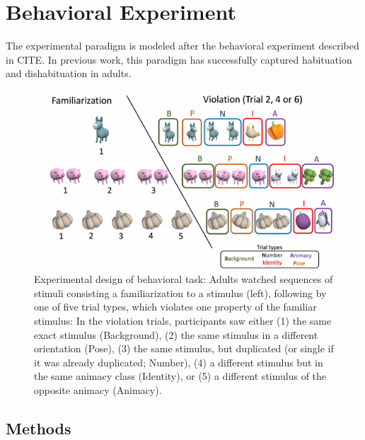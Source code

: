 \documentclass[10pt, letterpaper]{article}
\newenvironment{CodeChunk}{}{}
\begin{document}
\hypertarget{behavioral-experiment}{%
\section{Behavioral Experiment}\label{behavioral-experiment}}

The experimental paradigm is modeled after the behavioral experiment
described in CITE. In previous work, this paradigm has successfully
captured habituation and dishabituation in adults.

\begin{CodeChunk}
\begin{figure}[H]

{\centering \includegraphics{figs/design_fig-1} 

}

\caption[Experimental design of behavioral task]{Experimental design of behavioral task: Adults watched sequences of stimuli consisting a familiarization to a stimulus (left), following by one of five trial types, which violates one property of the familiar stimulus: In the violation trials, participants saw either (1) the same exact stimulus (Background), (2) the same stimulus in a different orientation (Pose), (3) the same stimulus, but duplicated (or single if it was already duplicated; Number), (4) a different stimulus but in the same animacy class (Identity), or (5) a different stimulus of the opposite animacy (Animacy).}\label{fig:design_fig}
\end{figure}
\end{CodeChunk}

\hypertarget{methods}{%
\subsection{Methods}\label{methods}}
\end{document}
